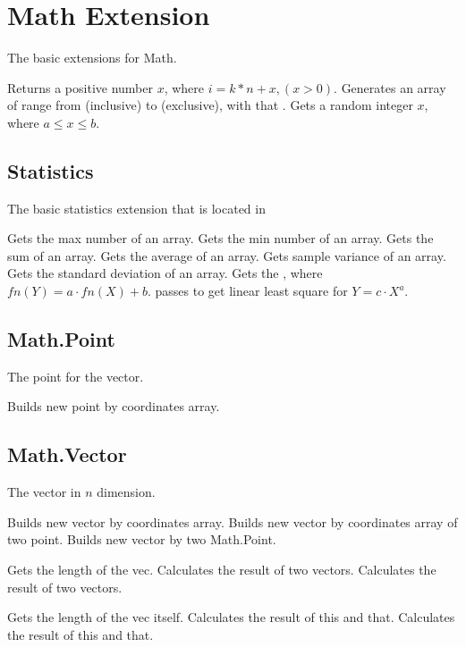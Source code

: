 \section{Math Extension}
The basic extensions for Math.

Returns a positive number $x$, where $i = k * n + x, (x > 0)$.
Generates an array of range from  (inclusive) to  (exclusive), with that .
Gets a random integer $x$, where $ a \leq x \leq b $.
 
\subsection{Statistics}
The basic statistics extension that is located in 

Gets the max number of an array.
Gets the min number of an array.
Gets the sum of an array.
Gets the average of an array.
Gets sample variance of an array.
Gets the standard deviation of an array.
Gets the \cd{[a, b]}, where $fn(Y) = a \cdot fn(X) + b$. passes  to get linear least square for $Y = c \cdot X^a$.


\subsection{Math.Point}
The point for the vector.

Builds new point by coordinates array.

\subsection{Math.Vector}
The vector in $n$ dimension.

Builds new vector by coordinates array.
Builds new vector by coordinates array of two point.
Builds new vector by two Math.Point.

Gets the length of the vec.
Calculates the  result of two vectors.
Calculates the  result of two vectors.

Gets the length of the vec itself.
Calculates the  result of this and that.
Calculates the  result of this and that.